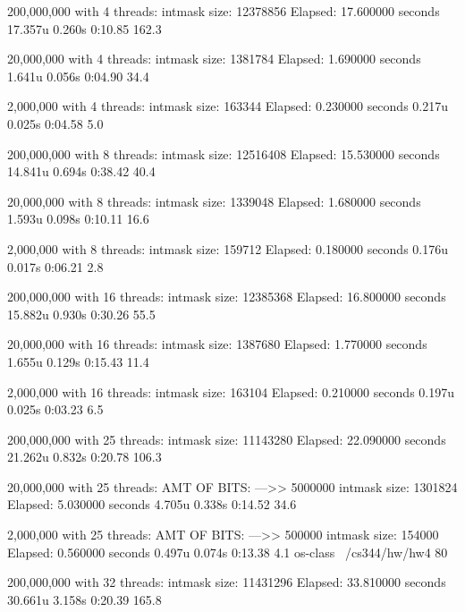 \documentclass[letterpaper,10pt,titlepage]{article}
\begin{document}
200,000,000 with 4 threads:
intmask size:  12378856
Elapsed: 17.600000 seconds
17.357u 0.260s 0:10.85 162.3%



20,000,000 with 4 threads:
intmask size:  1381784
Elapsed: 1.690000 seconds
1.641u 0.056s 0:04.90 34.4%


2,000,000 with 4 threads:
intmask size:  163344
Elapsed: 0.230000 seconds
0.217u 0.025s 0:04.58 5.0%





200,000,000 with 8 threads:
intmask size:  12516408
Elapsed: 15.530000 seconds
14.841u 0.694s 0:38.42 40.4%

20,000,000 with 8 threads:
intmask size:  1339048
Elapsed: 1.680000 seconds
1.593u 0.098s 0:10.11 16.6%

2,000,000 with 8 threads:
intmask size:  159712
Elapsed: 0.180000 seconds
0.176u 0.017s 0:06.21 2.8%



200,000,000 with 16 threads:
intmask size:  12385368
Elapsed: 16.800000 seconds
15.882u 0.930s 0:30.26 55.5%

20,000,000 with 16 threads:
intmask size:  1387680
Elapsed: 1.770000 seconds
1.655u 0.129s 0:15.43 11.4%



2,000,000 with 16 threads:
intmask size:  163104
Elapsed: 0.210000 seconds
0.197u 0.025s 0:03.23 6.5%








200,000,000 with 25 threads:
intmask size:  11143280
Elapsed: 22.090000 seconds
21.262u 0.832s 0:20.78 106.3%

20,000,000 with 25 threads:
AMT OF BITS:  --->> 5000000
intmask size:  1301824
Elapsed: 5.030000 seconds
4.705u 0.338s 0:14.52 34.6%


2,000,000 with 25 threads:
 AMT OF BITS:  --->> 500000
intmask size:  154000
Elapsed: 0.560000 seconds
0.497u 0.074s 0:13.38 4.1%
os-class ~/cs344/hw/hw4 80%





200,000,000 with 32 threads:
intmask size:  11431296
Elapsed: 33.810000 seconds
30.661u 3.158s 0:20.39 165.8%
\end{document}
